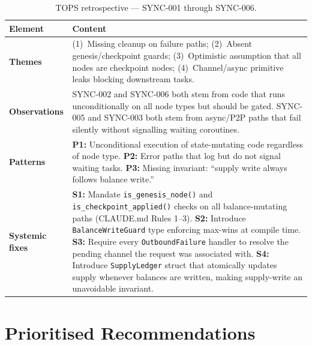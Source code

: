 \documentclass[12pt,a4paper]{article}
\begin{document}
\begin{table}[H]
\centering
\small
\renewcommand{\arraystretch}{1.3}
\begin{tabularx}{\linewidth}{lX}
\toprule
\textbf{Element} & \textbf{Content} \\
\midrule
\textbf{Themes} &
  (1)~Missing cleanup on failure paths; (2)~Absent genesis/checkpoint guards;
  (3)~Optimistic assumption that all nodes are checkpoint nodes;
  (4)~Channel/async primitive leaks blocking downstream tasks. \\
\rowcolor{rowgray}
\textbf{Observations} &
  SYNC-002 and SYNC-006 both stem from code that runs unconditionally on all
  node types but should be gated. SYNC-005 and SYNC-003 both stem from
  async/P2P paths that fail silently without signalling waiting coroutines. \\
\textbf{Patterns} &
  \textbf{P1:} Unconditional execution of state-mutating code regardless of node type.
  \textbf{P2:} Error paths that log but do not signal waiting tasks.
  \textbf{P3:} Missing invariant: ``supply write always follows balance write.'' \\
\rowcolor{rowgray}
\textbf{Systemic fixes} &
  \textbf{S1:} Mandate \texttt{is\_genesis\_node()} and \texttt{is\_checkpoint\_applied()}
  checks on all balance-mutating paths (CLAUDE.md Rules 1--3).
  \textbf{S2:} Introduce \texttt{BalanceWriteGuard} type enforcing max-wins at compile time.
  \textbf{S3:} Require every \texttt{OutboundFailure} handler to resolve the pending
  channel the request was associated with.
  \textbf{S4:} Introduce \texttt{SupplyLedger} struct that atomically updates supply
  whenever balances are written, making supply-write an unavoidable invariant. \\
\bottomrule
\end{tabularx}
\caption{TOPS retrospective --- SYNC-001 through SYNC-006.}
\end{table}

\section{Prioritised Recommendations}
\end{document}
